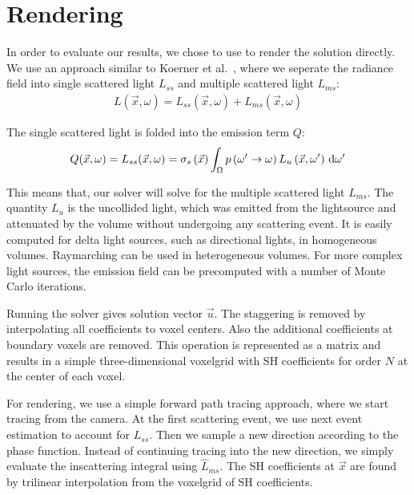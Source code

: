 \section{Rendering}
\label{sec:rendering}

In order to evaluate our results, we chose to use to render the solution directly. We use an approach similar to Koerner et al.~\cite{Koerner14}, where we seperate the radiance field into single scattered light $L_{ss}$ and multiple scattered light $L_{ms}$:
\begin{align}
L\left(\vec{x},\omega\right) = L_{ss}\left(\vec{x},\omega\right) + L_{ms}\left(\vec{x},\omega\right)
\end{align}

The single scattered light is folded into the emission term $Q$:
\begin{align}
Q(\vec{x}, \omega) = L_{ss}(\vec{x}, \omega) = \sigma_s\left(\vec{x}\right)\int_\Omega{ p\left(\omega'\rightarrow\omega\right) L_{u}\left(\vec{x}, \omega'\right)\,\mathrm{d}\omega' }
\end{align}

This means that, our solver will solve for the multiple scattered light $L_{ms}$. The quantity $L_u$ is the uncollided light, which was emitted from the lightsource and attenuated by the volume without undergoing any scattering event. It is easily computed for delta light sources, such as directional lights, in homogeneous volumes. Raymarching can be used in heterogeneous volumes. For more complex light sources, the emission field can be precomputed with a number of Monte Carlo iterations. 

Running the solver gives solution vector $\vec{u}$. The staggering is removed by interpolating all coefficients to voxel centers. Also the additional coefficients at boundary voxels are removed. This operation is represented as a matrix and results in a simple three-dimensional voxelgrid with SH coefficients for order $N$ at the center of each voxel.

For rendering, we use a simple forward path tracing approach, where we start tracing from the camera. At the first scattering event, we use next event estimation to account for $L_{ss}$. Then we sample a new direction according to the phase function. Instead of continuing tracing into the new direction, we simply evaluate the inscattering integral using $\widehat{L}_{ms}$. The SH coefficients at $\vec{x}$ are found by trilinear interpolation from the voxelgrid of SH coefficients.


